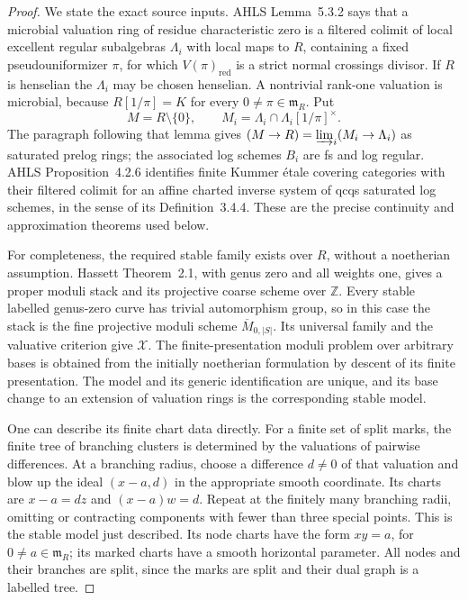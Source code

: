 \documentclass[11pt,a4paper]{article}
\providecommand{\mathscr}{\mathcal}
\begin{document}
\begin{proof}
We state the exact source inputs. AHLS Lemma~5.3.2 says that a
microbial valuation ring of residue characteristic zero is a
filtered colimit of local excellent regular subalgebras
$\Lambda_i$ with local maps to $R$, containing a fixed
pseudouniformizer $\pi$, for which $V(\pi)_{\mathrm{red}}$ is
a strict normal crossings divisor. If $R$ is henselian the
$\Lambda_i$ may be chosen henselian. A nontrivial rank-one
valuation is microbial, because $R[1/\pi]=K$ for every
$0\ne\pi\in\mathfrak m_R$. Put
\[
 M=R\setminus\{0\},\qquad
 M_i=\Lambda_i\cap\Lambda_i[1/\pi]^\times.
\]
The paragraph following that lemma gives
$(M\to R)=\varinjlim_i(M_i\to\Lambda_i)$ as saturated prelog
rings; the associated log schemes $B_i$ are fs and log regular.
AHLS Proposition~4.2.6 identifies finite Kummer \'etale covering
categories with their filtered colimit for an affine charted
inverse system of qcqs saturated log schemes, in the sense of its
Definition~3.4.4. These are the precise continuity and approximation
theorems used below.\citep[Definition~3.4.4,
Proposition~4.2.6, Lemma~5.3.2]{LA_AHLS2024}

For completeness, the required stable family exists over $R$,
without a noetherian assumption. Hassett Theorem~2.1, with genus
zero and all weights one, gives a proper moduli stack and its
projective coarse scheme over $\mathbb Z$. Every stable labelled
genus-zero curve has trivial automorphism group, so in this case
the stack is the fine projective moduli scheme
$\overline M_{0,|S|}$. Its universal family and the valuative
criterion give $\mathscr X$. The finite-presentation moduli
problem over arbitrary bases is obtained from the initially
noetherian formulation by descent of its finite presentation.
The model and its generic identification are unique, and its base
change to an extension of valuation rings is the corresponding
stable model.\citep[Theorem~2.1]{LA_Hassett2003}

One can describe its finite chart data directly. For a finite set
of split marks, the finite tree of branching clusters is determined
by the valuations of pairwise differences. At a branching radius,
choose a difference $d\ne0$ of that valuation and blow up the ideal
$(x-a,d)$ in the appropriate smooth coordinate. Its charts are
$x-a=dz$ and $(x-a)w=d$. Repeat at the finitely many branching
radii, omitting or contracting components with fewer than three
special points. This is the stable model just described. Its node
charts have the form $xy=a$, for $0\ne a\in\mathfrak m_R$;
its marked charts have a smooth horizontal parameter. All nodes
and their branches are split, since the marks are split and their
dual graph is a labelled tree.


\end{proof}
\end{document}
